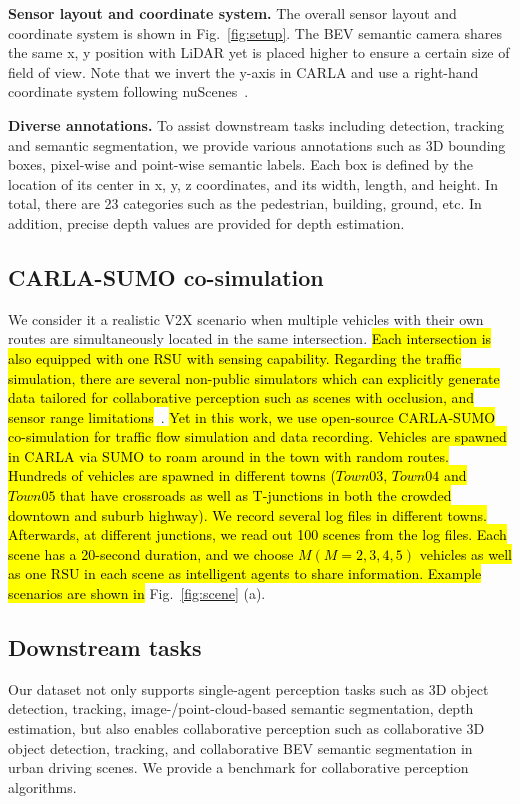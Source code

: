 \textbf{Sensor layout and coordinate system.}
The overall sensor layout and coordinate system is shown in Fig.~\ref{fig:setup}. The BEV semantic camera shares the same x, y position with LiDAR yet is placed higher to ensure a certain size of field of view. Note that we invert the y-axis in CARLA and use a right-hand coordinate system following nuScenes~\cite{Caesar2020nuScenesAM}. 

\textbf{Diverse annotations.}
To assist downstream tasks including detection, tracking and semantic segmentation, we provide various annotations such as 3D bounding boxes, pixel-wise and point-wise semantic labels. Each box is defined by the location of its center in x, y, z coordinates, and its width, length, and height. In total, there are 23 categories such as the pedestrian, building, ground, etc. In addition, precise depth values are provided for depth estimation.

\subsection{CARLA-SUMO co-simulation}
We consider it a realistic V2X scenario when multiple vehicles with their own routes are simultaneously located in the same intersection. \hl{ Each intersection is also equipped with one RSU with sensing capability. Regarding the traffic simulation, there are several non-public simulators which can explicitly generate data tailored for collaborative perception such as scenes with occlusion, and sensor range limitations}~\cite{suo2021trafficsim,tan2021scenegen}. \hl{Yet in this work, we use open-source CARLA-SUMO co-simulation for traffic flow simulation and data recording. Vehicles are spawned in CARLA via SUMO to roam around in the town with random routes. Hundreds of vehicles are spawned in different towns ($Town03$, $Town04$ and $Town05$ that have crossroads as well as T-junctions in both the crowded downtown and suburb highway). We record several log files in different towns. Afterwards, at different junctions, we read out 100 scenes from the log files. Each scene has a 20-second duration, and we choose $M (M=2,3,4,5)$ vehicles as well as one RSU in each scene as intelligent agents to share information. Example scenarios are shown in} Fig.~\ref{fig:scene} (a).

\subsection{Downstream tasks}
Our dataset not only supports single-agent perception tasks such as 3D object detection, tracking, image-/point-cloud-based semantic segmentation, depth estimation, but also enables collaborative perception such as collaborative 3D object detection, tracking, and collaborative BEV semantic segmentation in urban driving scenes. We provide a benchmark for collaborative perception algorithms.

